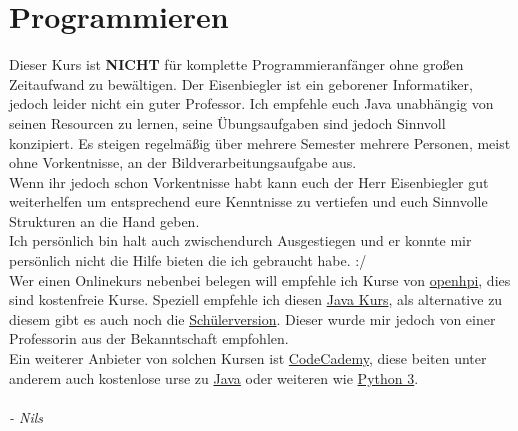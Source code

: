 \chapter{Programmieren}

Dieser Kurs ist \textbf{NICHT} für komplette Programmieranfänger ohne großen Zeitaufwand zu bewältigen. Der Eisenbiegler ist ein geborener Informatiker, jedoch leider nicht ein guter Professor. Ich empfehle euch Java unabhängig von seinen Resourcen zu lernen, seine Übungsaufgaben sind jedoch Sinnvoll konzipiert. Es steigen regelmäßig über mehrere Semester mehrere Personen, meist ohne Vorkentnisse, an der Bildverarbeitungsaufgabe aus.\\
Wenn ihr jedoch schon Vorkentnisse habt kann euch der Herr Eisenbiegler gut weiterhelfen um entsprechend eure Kenntnisse zu vertiefen und euch Sinnvolle Strukturen an die Hand geben.\\
Ich persönlich bin halt auch zwischendurch Ausgestiegen und er konnte mir persönlich nicht die Hilfe bieten die ich gebraucht habe. :/ \\
Wer einen Onlinekurs nebenbei belegen will empfehle ich Kurse von \href{https://open.hpi.de/courses}{openhpi}, dies sind kostenfreie Kurse. Speziell empfehle ich diesen \href{https://open.hpi.de/courses/javaeinstieg2020}{Java Kurs}, als alternative zu diesem gibt es auch noch die  \href{https://open.hpi.de/courses/javaeinstieg-schule2024}{Schülerversion}. Dieser wurde mir jedoch von einer Professorin aus der Bekanntschaft empfohlen. \\ Ein weiterer Anbieter von solchen Kursen ist \href{https://www.codecademy.com/learn/learn-java}{CodeCademy}, diese beiten unter anderem auch kostenlose urse zu \href{https://www.codecademy.com/learn/learn-java}{Java} oder weiteren wie \href{https://www.codecademy.com/learn/learn-python-3}{Python 3}.
\\~\\
\emph{- Nils}

\newpage

\newpage
